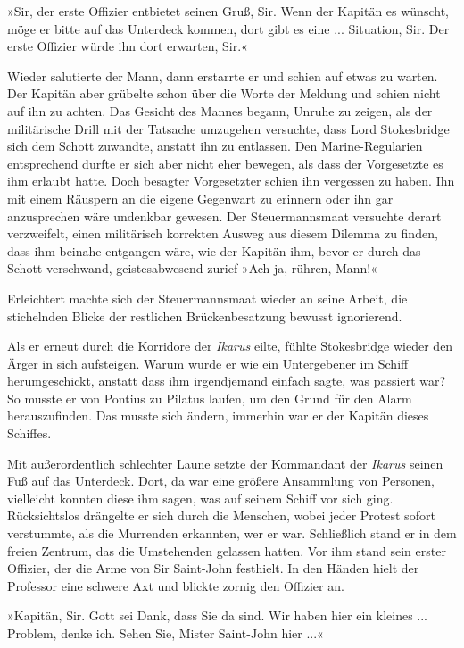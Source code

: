 »Sir, der erste Offizier entbietet seinen Gruß, Sir. Wenn der
Kapitän es wünscht, möge er bitte auf das Unterdeck kommen, dort
gibt es eine ... Situation, Sir. Der erste Offizier würde ihn dort
erwarten, Sir.«

Wieder salutierte der Mann, dann erstarrte er und schien auf etwas
zu warten. Der Kapitän aber grübelte schon über die Worte der
Meldung und schien nicht auf ihn zu achten. Das Gesicht des Mannes
begann, Unruhe zu zeigen, als der militärische Drill mit der
Tatsache umzugehen versuchte, dass Lord Stokesbridge sich dem
Schott zuwandte, anstatt ihn zu entlassen. Den Marine-Regularien
entsprechend durfte er sich aber nicht eher bewegen, als dass der
Vorgesetzte es ihm erlaubt hatte. Doch besagter Vorgesetzter schien
ihn vergessen zu haben. Ihn mit einem Räuspern an die eigene
Gegenwart zu erinnern oder ihn gar anzusprechen wäre undenkbar
gewesen. Der Steuermannsmaat versuchte derart verzweifelt, einen
militärisch korrekten Ausweg aus diesem Dilemma zu finden, dass ihm
beinahe entgangen wäre, wie der Kapitän ihm, bevor er durch das
Schott verschwand, geistesabwesend zurief »Ach ja, rühren, Mann!«

Erleichtert machte sich der Steuermannsmaat wieder an seine Arbeit,
die stichelnden Blicke der restlichen Brückenbesatzung bewusst
ignorierend.

Als er erneut durch die Korridore der \emph{Ikarus} eilte, fühlte
Stokesbridge wieder den Ärger in sich aufsteigen. Warum wurde er
wie ein Untergebener im Schiff herumgeschickt, anstatt dass ihm
irgendjemand einfach sagte, was passiert war? So musste er von
Pontius zu Pilatus laufen, um den Grund für den Alarm
herauszufinden. Das musste sich ändern, immerhin war er der Kapitän
dieses Schiffes.

\bigpar

Mit außerordentlich schlechter Laune setzte der Kommandant der
\emph{Ikarus} seinen Fuß auf das Unterdeck. Dort, da war eine
größere Ansammlung von Personen, vielleicht konnten diese ihm
sagen, was auf seinem Schiff vor sich ging. Rücksichtslos drängelte
er sich durch die Menschen, wobei jeder Protest sofort verstummte,
als die Murrenden erkannten, wer er war. Schließlich stand er in
dem freien Zentrum, das die Umstehenden gelassen hatten. Vor ihm
stand sein erster Offizier, der die Arme von Sir Saint-John
festhielt. In den Händen hielt der Professor eine schwere Axt und
blickte zornig den Offizier an.

»Kapitän, Sir. Gott sei Dank, dass Sie da sind. Wir haben hier ein
kleines ... Problem, denke ich. Sehen Sie, Mister Saint-John hier
...«

